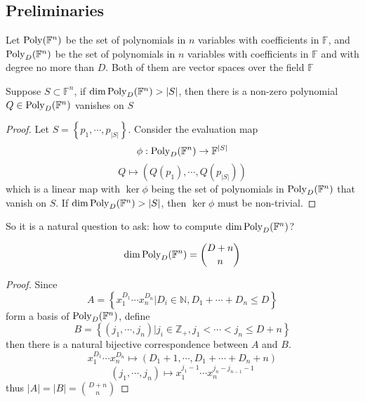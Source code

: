 \subsection{Preliminaries}

\begin{definition}\label{definition 1}
Let $\operatorname{Poly}(\mathbb{F}^{n}) $ be the set of polynomials in $ n $ variables with coefficients in $ \mathbb{F} $, and $ \operatorname{Poly}_{D}(\mathbb{F}^{n}) $ be the set of polynomials in $ n $ variables with coefficients in $ \mathbb{F} $ and with degree no more than $D$. Both of them are vector spaces over the field $ \mathbb{F} $
\end{definition}

\begin{proposition}\label{proposition 2}
Suppose $ S \subset \mathbb{F}^{n} $, if $ \dim\operatorname{Poly}_{D}(\mathbb{F}^{n}) > |S| $, then there is a non-zero polynomial $ Q \in \operatorname{Poly}_{D}(\mathbb{F}^{n}) $ vanishes on $ S $
\end{proposition}

\begin{proof}
Let $ S = \left\{ p_{1}, \cdots , p_{|S|} \right\} $. Consider the evaluation map 
$$ \phi : \operatorname{Poly}_{D}(\mathbb{F}^{n}) \rightarrow \mathbb{F}^{|S|} $$
$$ Q \mapsto \left( Q(p_{1}), \cdots, Q(p_{|S|}) \right) $$
which is a linear map with $ \ker\phi $ being the set of polynomials in $ \operatorname{Poly}_{D}(\mathbb{F}^{n}) $ that vanish on $ S $. If $ \mathrm{dim}\operatorname{Poly}_{D}(\mathbb{F}^{n}) > |S| $, then $ \ker\phi $ must be non-trivial.
\end{proof}

So it is a natural question to ask: how to compute $ \mathrm{dim}\operatorname{Poly}_{D}(\mathbb{F}^{n}) $?

\begin{proposition}\label{proposition 3}
$$ \mathrm{dim}\operatorname{Poly}_{D}(\mathbb{F}^{n}) = \binom{D+n}{n} $$
\end{proposition}

\begin{proof}
Since 
$$ A = \left\{ x_{1}^{D_{1}} \cdots x_{n}^{D_{n}} \Big| D_{i} \in \mathbb{N}, D_{1} + \cdots + D_{n} \leq D \right\} $$
form a basis of $ \operatorname{Poly}_{D}(\mathbb{F}^{n}) $, define 
$$ B = \left\{ \left( j_{1}, \cdots, j_{n} \right) \Big| j_{i} \in \mathbb{Z}_{+}, j_{1} < \cdots < j_{n} \leq D+n \right\} $$
then there is a natural bijective correspondence between $ A $ and $ B $.
$$ x_{1}^{D_{1}} \cdots x_{n}^{D_{n}} \mapsto \left( D_{1} + 1, \cdots, D_{1} + \cdots + D_{n} + n \right) $$
$$ \left( j_{1}, \cdots, j_{n} \right) \mapsto x_{1}^{j_{1}-1} \cdots x_{n}^{j_{n}-j_{n-1}-1} $$ 
thus $ |A| = |B| = \binom{D+n}{n} $
\end{proof}

